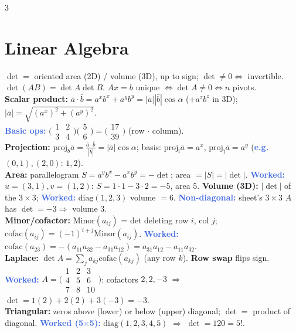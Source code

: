 \documentclass[9pt]{extarticle}
\newcommand{\ex}[1]{\textbf{\textcolor{RoyalBlue}{#1}}}
\begin{document}
\begin{multicols}{3}
\section{Linear Algebra}
\begin{sloppypar}\raggedright
$\det=$ oriented area (2D) / volume (3D), up to sign; $\det\ne0\iff$ invertible. $\det(AB)=\det A\det B$. $Ax=b$ unique $\iff\det A\ne0\iff n$ pivots.\\
\textbf{Scalar product:} $\bar a{\cdot}\bar b=a^xb^x+a^yb^y=|\bar a||\bar b|\cos\alpha$ (+$a^zb^z$ in 3D); $|\bar a|=\sqrt{(a^x)^2+(a^y)^2}$.\\
\ex{Basic ops:} $\big(\begin{smallmatrix}1&2\\3&4\end{smallmatrix}\big)\big(\begin{smallmatrix}5\\6\end{smallmatrix}\big)=\big(\begin{smallmatrix}17\\39\end{smallmatrix}\big)$ (row $\cdot$ column).\\
\textbf{Projection:} $\mathrm{proj}_{\bar b}\bar a=\tfrac{\bar a\cdot\bar b}{|\bar b|}=|\bar a|\cos\alpha$; basis: $\mathrm{proj}_{\bar\imath}\bar a=a^x$, $\mathrm{proj}_{\bar\jmath}\bar a=a^y$ (\ex{e.g.} $(0,1),(2,0)$: $1,2$).\\
\textbf{Area:} parallelogram $S=a^yb^x-a^xb^y=-\det$; area $=|S|=|\det|$. \ex{Worked:} $u=(3,1),v=(1,2)$: $S=1\cdot1-3\cdot2=-5$, area $5$. \textbf{Volume (3D):} $|\det|$ of the $3\times3$; \ex{Worked:} $\mathrm{diag}(1,2,3)$ volume $=6$. \ex{Non-diagonal:} sheet's $3\times3$ $A$ has $\det=-3\Rightarrow$ volume $3$.\\
\textbf{Minor/cofactor:} $\mathrm{Minor}(a_{ij})$ = det deleting row $i$, col $j$; $\mathrm{cofac}(a_{ij})=(-1)^{i+j}\mathrm{Minor}(a_{ij})$. \ex{Worked:} $\mathrm{cofac}(a_{23})=-(a_{11}a_{32}-a_{31}a_{12})=a_{31}a_{12}-a_{11}a_{32}$.\\
\textbf{Laplace:} $\det A=\sum_j a_{kj}\mathrm{cofac}(a_{kj})$ (any row $k$). \textbf{Row swap} flips sign. \ex{Worked:} $A=\big(\begin{smallmatrix}1&2&3\\4&5&6\\7&8&10\end{smallmatrix}\big)$: cofactors $2,2,-3$ $\Rightarrow$ $\det=1(2)+2(2)+3(-3)=-3$.\\
\textbf{Triangular:} zeros above (lower) or below (upper) diagonal; $\det=$ product of diagonal. \ex{Worked (5$\times$5):} $\mathrm{diag}(1,2,3,4,5)$ $\Rightarrow$ $\det=120=5!$.\\

\end{sloppypar}
\end{multicols}
\end{document}

